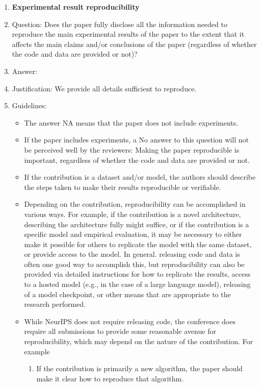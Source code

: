 \documentclass{article}
\begin{document}
\begin{enumerate}
    \item {\bf Experimental result reproducibility}
    \item[] Question: Does the paper fully disclose all the information needed to reproduce the main experimental results of the paper to the extent that it affects the main claims and/or conclusions of the paper (regardless of whether the code and data are provided or not)?
    \item[] Answer: \answerYes{} %
    \item[] Justification: We provide all details sufficient to reproduce.
    \item[] Guidelines:
    \begin{itemize}
        \item The answer NA means that the paper does not include experiments.
        \item If the paper includes experiments, a No answer to this question will not be perceived well by the reviewers: Making the paper reproducible is important, regardless of whether the code and data are provided or not.
        \item If the contribution is a dataset and/or model, the authors should describe the steps taken to make their results reproducible or verifiable. 
        \item Depending on the contribution, reproducibility can be accomplished in various ways. For example, if the contribution is a novel architecture, describing the architecture fully might suffice, or if the contribution is a specific model and empirical evaluation, it may be necessary to either make it possible for others to replicate the model with the same dataset, or provide access to the model. In general. releasing code and data is often one good way to accomplish this, but reproducibility can also be provided via detailed instructions for how to replicate the results, access to a hosted model (e.g., in the case of a large language model), releasing of a model checkpoint, or other means that are appropriate to the research performed.
        \item While NeurIPS does not require releasing code, the conference does require all submissions to provide some reasonable avenue for reproducibility, which may depend on the nature of the contribution. For example
        \begin{enumerate}
            \item If the contribution is primarily a new algorithm, the paper should make it clear how to reproduce that algorithm.

\end{enumerate}
\end{itemize}
\end{enumerate}
\end{document}

